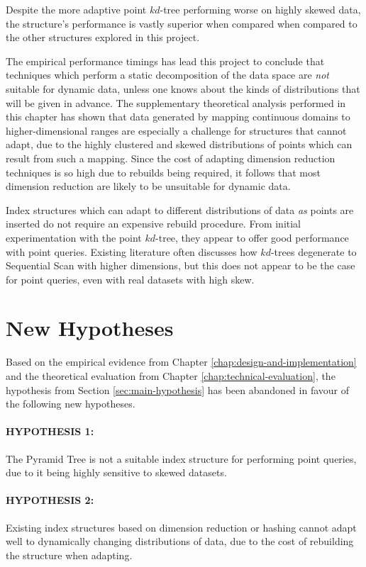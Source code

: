 Despite the more adaptive point $kd$-tree performing worse on highly skewed data, the structure's performance is vastly superior when compared when compared to the other structures explored in this project.

The empirical performance timings has lead this project to conclude that techniques which perform a static decomposition of the data space are \textit{not} suitable for dynamic data, unless one knows about the kinds of distributions that will be given in advance. The supplementary theoretical analysis performed in this chapter has shown that data generated by mapping continuous domains to higher-dimensional ranges are especially a challenge for structures that cannot adapt, due to the highly clustered and skewed distributions of points which can result from such a mapping. Since the cost of adapting dimension reduction techniques is so high due to rebuilds being required, it follows that most dimension reduction are likely to be unsuitable for dynamic data.

Index structures which can adapt to different distributions of data \textit{as} points are inserted do not require an expensive rebuild procedure. From initial experimentation with the point $kd$-tree, they appear to offer good performance with point queries. Existing literature often discusses how $kd$-trees degenerate to Sequential Scan with higher dimensions, but this does not appear to be the case for point queries, even with real datasets with high skew.

\section{New Hypotheses}

Based on the empirical evidence from Chapter \ref{chap:design-and-implementation} and the theoretical evaluation from Chapter \ref{chap:technical-evaluation}, the hypothesis from Section \ref{sec:main-hypothesis} has been abandoned in favour of the following new hypotheses.

\paragraph{\textbf{HYPOTHESIS 1:}} The Pyramid Tree is not a suitable index structure for performing point queries, due to it being highly sensitive to skewed datasets.

\paragraph{\textbf{HYPOTHESIS 2:}} Existing index structures based on dimension reduction or hashing cannot adapt well to dynamically changing distributions of data, due to the cost of rebuilding the structure when adapting.

